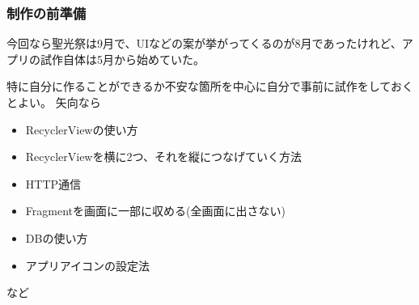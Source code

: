 \documentclass[dvipdfmx,jb5]{jreport}
\begin{document}
\subsubsection{制作の前準備}
今回なら聖光祭は9月で、UIなどの案が挙がってくるのが8月であったけれど、アプリの試作自体は5月から始めていた。\par
特に自分に作ることができるか不安な箇所を中心に自分で事前に試作をしておくとよい。
矢向なら
\begin{itemize}
      \item RecyclerViewの使い方
      \item RecyclerViewを横に2つ、それを縦につなげていく方法
      \item HTTP通信
      \item Fragmentを画面に一部に収める(全画面に出さない)
      \item DBの使い方
      \item アプリアイコンの設定法
\end{itemize}
など
\end{document}
